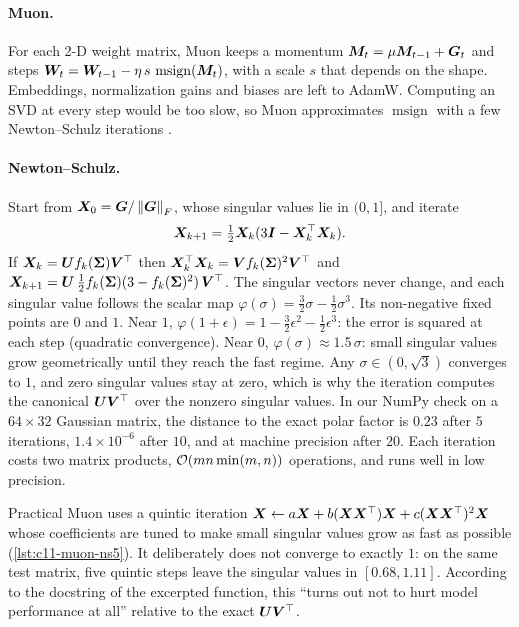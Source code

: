 \paragraph{Muon.} For each 2-D weight matrix, Muon keeps a momentum
$\bm{M}_t = \mu\bm{M}_{t-1} + \bm{G}_t$ and steps $\bm{W}_t = \bm{W}_{t-1} - \eta\,s\,\operatorname{msign}(\bm{M}_t)$,
with a scale $s$ that depends on the shape. Embeddings, normalization gains and biases are left to
AdamW. Computing an SVD at every step would be too slow, so Muon approximates
$\operatorname{msign}$ with a few Newton--Schulz iterations \citep{c01-higham2008functions}.

\paragraph{Newton--Schulz.} Start from $\bm{X}_0 = \bm{G}/\left\lVert \bm{G}\right\rVert_F$, whose singular values lie in
$(0,1]$, and iterate
\begin{equation}
  \bm{X}_{k+1} = \tfrac12\bm{X}_k(3\bm{I} - \bm{X}_k^{\top}\bm{X}_k).
  \label{eq:c11-ns3}
\end{equation}
If $\bm{X}_k = \bm{U} f_k(\bm{\Sigma})\bm{V}^{\top}$ then $\bm{X}_k^{\top}\bm{X}_k = \bm{V} f_k(\bm{\Sigma})^2\bm{V}^{\top}$ and
$\bm{X}_{k+1} = \bm{U}\,\tfrac12 f_k(\bm{\Sigma})(3 - f_k(\bm{\Sigma})^2)\,\bm{V}^{\top}$. The singular vectors never
change, and each singular value follows the scalar map
$\varphi(\sigma) = \tfrac32\sigma - \tfrac12\sigma^3$. Its non-negative fixed points are $0$ and $1$. Near $1$,
$\varphi(1+\epsilon) = 1 - \tfrac32\epsilon^2 - \tfrac12\epsilon^3$: the error is squared at each
step (quadratic convergence). Near $0$, $\varphi(\sigma) \approx 1.5\,\sigma$: small singular
values grow geometrically until they reach the fast regime. Any $\sigma \in (0, \sqrt3)$
converges to $1$, and zero singular values stay at zero, which is why the iteration computes the
canonical $\bm{U}\bm{V}^{\top}$ over the nonzero singular values. In our NumPy check on a $64\times 32$
Gaussian matrix, the distance to the exact polar factor is $0.23$ after $5$ iterations,
$1.4\times10^{-6}$ after $10$, and at machine precision after $20$. Each iteration costs two
matrix products, $\mathcal{O}(mn\min(m,n))$ operations, and runs well in low precision.

Practical Muon uses a quintic iteration $\bm{X} \leftarrow a\bm{X} + b(\bm{X}\bm{X}^{\top})\bm{X} + c(\bm{X}\bm{X}^{\top})^2\bm{X}$
whose coefficients are tuned to make small singular values grow as fast as possible
(\cref{lst:c11-muon-ns5}). It deliberately does not converge to exactly $1$: on the same test
matrix, five quintic steps leave the singular values in $[0.68, 1.11]$. According to the docstring
of the excerpted function, this ``turns out not to hurt model performance at all'' relative to the
exact $\bm{U}\bm{V}^{\top}$.

